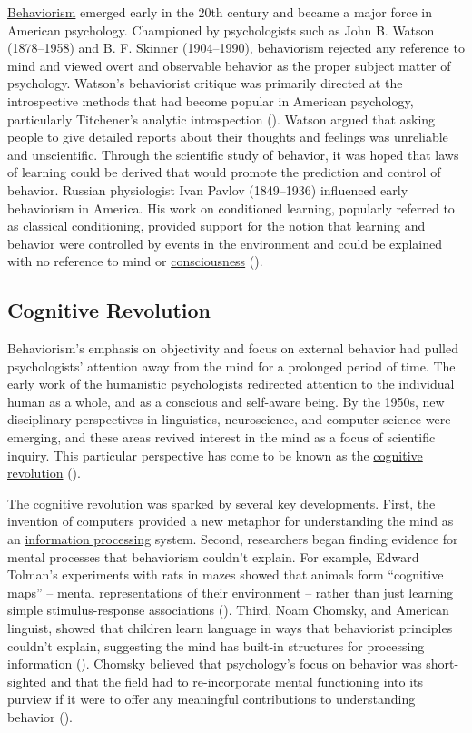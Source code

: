 \documentclass[
]{krantz}
\begin{document}
\hyperref[behaviorism]{Behaviorism} emerged early in the 20th century and became a major force in American psychology. Championed by psychologists such as John B. Watson (1878--1958) and B. F. Skinner (1904--1990), behaviorism rejected any reference to mind and viewed overt and observable behavior as the proper subject matter of psychology. Watson's behaviorist critique was primarily directed at the introspective methods that had become popular in American psychology, particularly Titchener's analytic introspection (). Watson argued that asking people to give detailed reports about their thoughts and feelings was unreliable and unscientific. Through the scientific study of behavior, it was hoped that laws of learning could be derived that would promote the prediction and control of behavior. Russian physiologist Ivan Pavlov (1849--1936) influenced early behaviorism in America. His work on conditioned learning, popularly referred to as classical conditioning, provided support for the notion that learning and behavior were controlled by events in the environment and could be explained with no reference to mind or \hyperref[consciousness]{consciousness} ().

\subsection*{Cognitive Revolution}\label{cognitive-revolution}


Behaviorism's emphasis on objectivity and focus on external behavior had pulled psychologists' attention away from the mind for a prolonged period of time. The early work of the humanistic psychologists redirected attention to the individual human as a whole, and as a conscious and self-aware being. By the 1950s, new disciplinary perspectives in linguistics, neuroscience, and computer science were emerging, and these areas revived interest in the mind as a focus of scientific inquiry. This particular perspective has come to be known as the \hyperref[cognitive-revolution]{cognitive revolution} ().

The cognitive revolution was sparked by several key developments. First, the invention of computers provided a new metaphor for understanding the mind as an \hyperref[information-processing]{information processing} system. Second, researchers began finding evidence for mental processes that behaviorism couldn't explain. For example, Edward Tolman's experiments with rats in mazes showed that animals form ``cognitive maps'' -- mental representations of their environment -- rather than just learning simple stimulus-response associations (). Third, Noam Chomsky, and American linguist, showed that children learn language in ways that behaviorist principles couldn't explain, suggesting the mind has built-in structures for processing information (). Chomsky believed that psychology's focus on behavior was short-sighted and that the field had to re-incorporate mental functioning into its purview if it were to offer any meaningful contributions to understanding behavior ().
\end{document}
